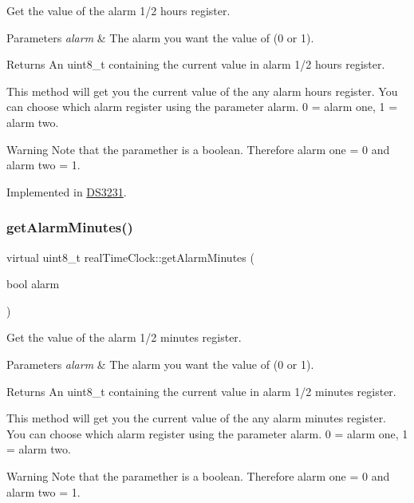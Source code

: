 Get the value of the alarm 1/2 hours register. 


\begin{DoxyParams}{Parameters}
{\em alarm} & The alarm you want the value of (0 or 1). \\
\hline
\end{DoxyParams}
\begin{DoxyReturn}{Returns}
An uint8\+\_\+t containing the current value in alarm 1/2 hours register.
\end{DoxyReturn}
This method will get you the current value of the any alarm hours register. You can choose which alarm register using the parameter alarm. 0 = alarm one, 1 = alarm two. \begin{DoxyWarning}{Warning}
Note that the paramether is a boolean. Therefore alarm one = 0 and alarm two = 1. 
\end{DoxyWarning}


Implemented in \mbox{\hyperlink{class_d_s3231_a8dc2f4546600209d16f109764c2f4434}{D\+S3231}}.

\mbox{\label{classreal_time_clock_a0b3babca96f8246d4bb5e3ac2a95801d}} 
\subsubsection{\texorpdfstring{get\+Alarm\+Minutes()}{getAlarmMinutes()}}
{\footnotesize\ttfamily virtual uint8\+\_\+t real\+Time\+Clock\+::get\+Alarm\+Minutes (\begin{DoxyParamCaption}\item[{bool}]{alarm }\end{DoxyParamCaption})\hspace{0.3cm}{\ttfamily [pure virtual]}}



Get the value of the alarm 1/2 minutes register. 


\begin{DoxyParams}{Parameters}
{\em alarm} & The alarm you want the value of (0 or 1). \\
\hline
\end{DoxyParams}
\begin{DoxyReturn}{Returns}
An uint8\+\_\+t containing the current value in alarm 1/2 minutes register.
\end{DoxyReturn}
This method will get you the current value of the any alarm minutes register. You can choose which alarm register using the parameter alarm. 0 = alarm one, 1 = alarm two. \begin{DoxyWarning}{Warning}
Note that the paramether is a boolean. Therefore alarm one = 0 and alarm two = 1. 
\end{DoxyWarning}


